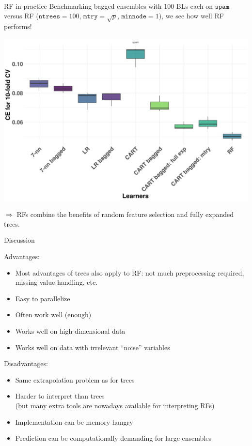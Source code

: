 \documentclass[11pt,compress,t,notes=noshow, xcolor=table]{beamer}
\begin{document}
\begin{vbframe}{RF in practice}
\small{
Benchmarking bagged ensembles with 100 BLs each on $\texttt{spam}$
versus RF ($\texttt{ntrees} = 100$, $\texttt{mtry} = \sqrt{p}$, $\texttt{minnode} = 1$),
we see how well RF performs!
}

\begin{center}
\includegraphics[clip=true, trim={0 35 0 30}, width=0.85\linewidth]{figure/bagging-bench_RF.png}
\end{center}

{\footnotesize $\Rightarrow$ RFs combine the benefits of random feature selection and fully expanded trees.}

\end{vbframe}

\begin{vbframe}{Discussion}

Advantages:
\begin{itemize}
  \item Most advantages of trees also apply to RF: not much preprocessing required, missing value handling, etc.
  \item Easy to parallelize
  \item Often work well (enough)
  \item Works well on high-dimensional data
  \item Works well on data with irrelevant \enquote{noise} variables
\end{itemize}

\lz

Disadvantages:
\begin{itemize}
  \item Same extrapolation problem as for trees
  \item Harder to interpret than trees \\
    (but many extra tools are nowadays
    available for interpreting RFs)
  \item Implementation can be memory-hungry
  \item Prediction can be computationally demanding for large ensembles
\end{itemize}

\end{vbframe}

\endlecture
\end{document}
